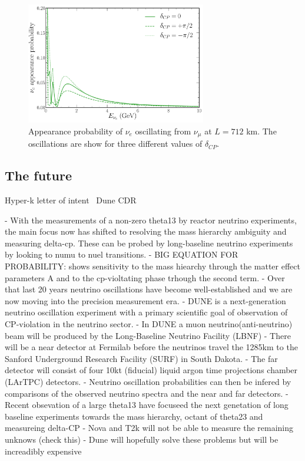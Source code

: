 \begin{figure} %
    \includegraphics[origin=c,width=0.7\textwidth]{diagrams/6-cvn/chipsnet/explore_osc_cp_probs.pdf}
    \caption[$\nu_{e}$ appearance probability for different $\delta_{CP}$ values]
    {Appearance probability of $\nu_{e}$ oscillating from $\nu_{\mu}$ at $L=712$ km. The
        oscillations are show for three different values of $\delta_{CP}$.}
    \label{fig:osc_cp_probs}
\end{figure}

\subsection{The future} %
\label{sec:theory_status_future} %

Hyper-k letter of intent~\cite{abe2011}
Dune CDR~\cite{acciarri2016}

- With the measurements of a non-zero theta13 by reactor neutrino experiments, the main focus now
has shifted to resolving the mass hierarchy ambiguity and measuring delta-cp. These can be probed
by long-baseline neutrino experiments by looking to numu to nuel transitions.
- BIG EQUATION FOR PROBABILITY: shows sensitivity to the mass hiearchy through the matter effect
parameters A and to the cp-violtating phase trhough the second term.
- Over that last 20 years neutrino oscillations have become well-established and we are now moving
into the precision measurement era.
- DUNE is a next-generation neutrino oscillation experiment with a primary scientific goal of
observation of CP-violation in the neutrino sector.
- In DUNE a muon neutrino(anti-neutrino) beam will be produced by the Long-Baseline Neutrino
Facility (LBNF)
- There will be a near detector at Fermilab before the neutrinos travel the 1285km to the Sanford
Underground Research Facility (SURF) in South Dakota.
- The far detector will consist of four 10kt (fiducial) liquid argon time projections chamber
(LArTPC) detectors.
- Neutrino oscillation probabilities can then be infered by comparisons of the observed neutrino
spectra and the near and far detectors.
- Recent obsevation of a large theta13 have focuseed the next genetation of long baseline
experiments towards the mass hierarchy, octant of theta23 and measureing delta-CP
- Nova and T2k will not be able to measure the remaining unknows (check this)
- Dune will hopefully solve these problems but will be increadibly expensive

